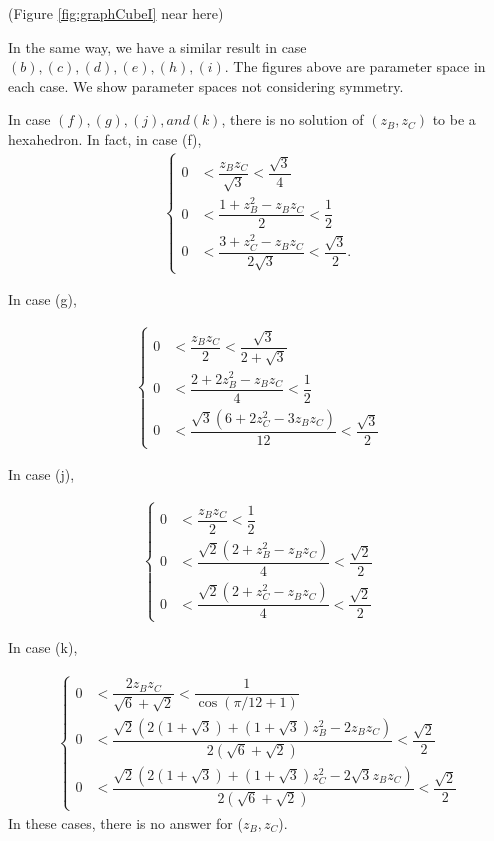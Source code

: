 \documentclass[suppldata, dvipdfmx]{interact}
\theoremstyle{plain}%
\theoremstyle{definition}
\theoremstyle{remark}
\theoremstyle{problemstyle}
\begin{document}
\noindent(Figure \ref{fig:graphCubeI} near here)

In the same way, we have a similar result in case 
$(b), (c), (d), (e), (h), (i)$. 
The figures above are parameter space in each case.
We show parameter spaces not considering symmetry.

In case $(f), (g), (j), and (k)$, there is no solution of $(z_B, z_C)$
to be a hexahedron. In fact, in case (f),
\begin{align*}
\begin{cases}
 0 &< \dfrac{z_Bz_C}{\sqrt{3}} < \dfrac{\sqrt{3}}{4} \\
 0 &< \dfrac{1 + z^2_B - z_Bz_C}{2} < \dfrac{1}{2} \\
 0 &< \dfrac{3 + z^2_C - z_Bz_C}{2\sqrt{3}} < \dfrac{\sqrt{3}}{2}.
\end{cases}
\end{align*}

In case (g),

\begin{align*}
\begin{cases}
0 &< \dfrac{z_Bz_C}{2} < \dfrac{\sqrt{3}}{2 + \sqrt{3}} \\
0 &< \dfrac{2 + 2z^2_B - z_Bz_C}{4} < \dfrac{1}{2} \\
0 &< \dfrac{\sqrt{3}(6 + 2z^2_C - 3z_Bz_C)}{12} < \dfrac{\sqrt{3}}{2}
\end{cases}
\end{align*}

In case (j),

\begin{align*}
 \begin{cases}
  0 &< \dfrac{z_Bz_C}{2} < \dfrac{1}{2}\\
  0 &< \dfrac{\sqrt{2}(2 + z^2_B - z_B z_C)}{4} < \dfrac{\sqrt{2}}{2}\\
  0 &< \dfrac{\sqrt{2}(2 + z^2_C - z_B z_C)}{4} < \dfrac{\sqrt{2}}{2}
 \end{cases}
\end{align*}

In case (k),

\begin{align*}
 \begin{cases}
  0 &< \dfrac{2z_Bz_C}{\sqrt{6} + \sqrt{2}} < \dfrac{1}{\cos(\pi/12+1)}\\
  0 &< \dfrac{\sqrt{2}(2 (1 + \sqrt{3}) + (1 + \sqrt{3})z^2_B -2z_Bz_C)}
  {2(\sqrt{6} + \sqrt{2})} < \dfrac{\sqrt{2}}{2}\\
  0 &< \dfrac{\sqrt{2}(2 (1 + \sqrt{3}) + (1 + \sqrt{3})z^2_C
  -2\sqrt{3}z_Bz_C)}
  {2(\sqrt{6} + \sqrt{2})} < \dfrac{\sqrt{2}}{2}
 \end{cases}
\end{align*}
In these cases, there is no answer for ($z_B, z_C$).
\end{document}

